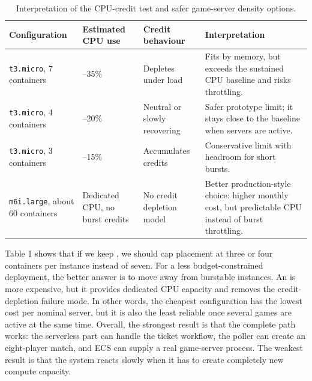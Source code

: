 \documentclass[9pt,a4paper,twocolumn,twoside]{tau-class/tau}
\begin{document}
\begin{table}[t]
    \centering
    \scriptsize
    \setlength{\tabcolsep}{4pt}
    \caption{Interpretation of the CPU-credit test and safer game-server density options.}
    \label{tab:cpu-credit-density}
    \begin{tabular}{@{}>{\raggedright\arraybackslash}p{3.0cm}
                    >{\raggedright\arraybackslash}p{3.0cm}
                    >{\raggedright\arraybackslash}p{4.2cm}
                    >{\raggedright\arraybackslash}p{5.0cm}@{}}
        \toprule
        \textbf{Configuration} & \textbf{Estimated CPU use} & \textbf{Credit behaviour} & \textbf{Interpretation} \\
        \midrule
        \texttt{t3.micro}, 7 containers & 21--35\% & Depletes under load & Fits by memory, but exceeds the sustained CPU baseline and risks throttling. \\
        \texttt{t3.micro}, 4 containers & 12--20\% & Neutral or slowly recovering & Safer prototype limit; it stays close to the baseline when servers are active. \\
        \texttt{t3.micro}, 3 containers & 9--15\% & Accumulates credits & Conservative limit with headroom for short bursts. \\
        \texttt{m6i.large}, about 60 containers & Dedicated CPU, no burst credits & No credit depletion model & Better production-style choice: higher monthly cost, but predictable CPU instead of burst throttling. \\
        \bottomrule
    \end{tabular}
\end{table}

Table 1 shows that if we keep , we should cap placement at three or four containers per instance instead of seven. 
For a less budget-constrained deployment, the better answer is to move away from burstable  instances. An  is more expensive, but it provides dedicated CPU capacity and removes the credit-depletion failure mode. In other words, the cheapest configuration has the lowest cost per nominal server, but it is also the least reliable once several games are active at the same time.
Overall, the strongest result is that the complete path works: the serverless part can handle the ticket workflow, the poller can create an eight-player match, and ECS can supply a real game-server process. The weakest result is that the system reacts slowly when it has to create completely new compute capacity.
\end{document}
